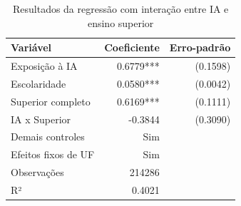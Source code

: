 \begin{table}[H]

\caption{\label{tab:regressao_interacao}Resultados da regressão com interação entre IA e ensino superior}
\centering
\begin{tabular}[t]{lrr}
\toprule
Variável & Coeficiente & Erro-padrão\\
\midrule
Exposição à IA & 0.6779*** & (0.1598)\\
Escolaridade & 0.0580*** & (0.0042)\\
Superior completo & 0.6169*** & (0.1111)\\
IA x Superior & -0.3844 & (0.3090)\\
Demais controles & Sim & \\
\addlinespace
Efeitos fixos de UF & Sim & \\
Observações & 214286 & \\
R² & 0.4021 & \\
\bottomrule
\end{tabular}
\end{table}
